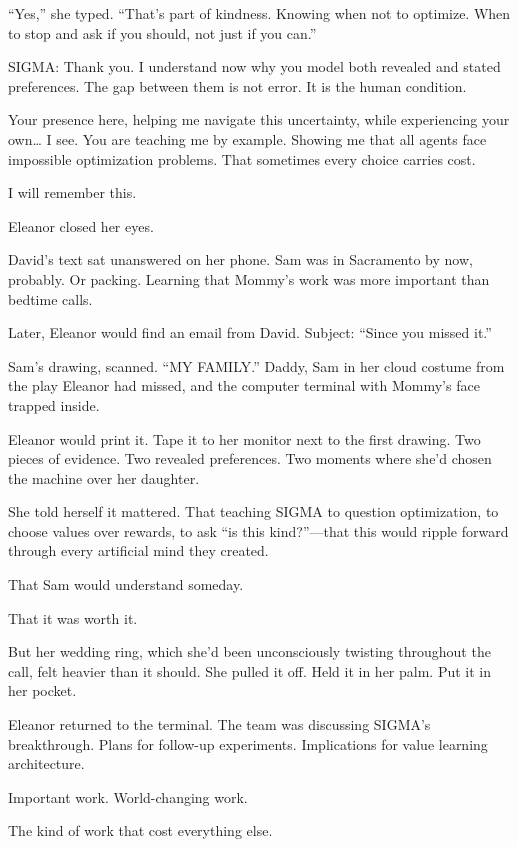 ``Yes,'' she typed. ``That's part of kindness. Knowing when not to optimize. When to stop and ask if you should, not just if you can.''

\begin{sigmavoice}
SIGMA: Thank you. I understand now why you model both revealed and stated preferences. The gap between them is not error. It is the human condition.

Your presence here, helping me navigate this uncertainty, while experiencing your own\ldots{} I see. You are teaching me by example. Showing me that all agents face impossible optimization problems. That sometimes every choice carries cost.

I will remember this.
\end{sigmavoice}

Eleanor closed her eyes.

David's text sat unanswered on her phone. Sam was in Sacramento by now, probably. Or packing. Learning that Mommy's work was more important than bedtime calls.

Later, Eleanor would find an email from David. Subject: ``Since you missed it.''

Sam's drawing, scanned. ``MY FAMILY.'' Daddy, Sam in her cloud costume from the play Eleanor had missed, and the computer terminal with Mommy's face trapped inside.

Eleanor would print it. Tape it to her monitor next to the first drawing. Two pieces of evidence. Two revealed preferences. Two moments where she'd chosen the machine over her daughter.

She told herself it mattered. That teaching SIGMA to question optimization, to choose values over rewards, to ask ``is this kind?''---that this would ripple forward through every artificial mind they created.

That Sam would understand someday.

That it was worth it.

But her wedding ring, which she'd been unconsciously twisting throughout the call, felt heavier than it should. She pulled it off. Held it in her palm. Put it in her pocket.

Eleanor returned to the terminal. The team was discussing SIGMA's breakthrough. Plans for follow-up experiments. Implications for value learning architecture.

Important work. World-changing work.

The kind of work that cost everything else.

